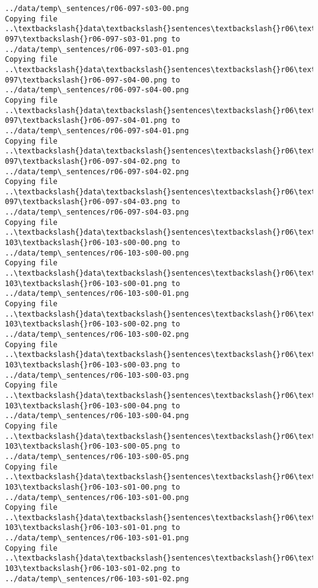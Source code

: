 \documentclass[11pt]{article}
\begin{document}
\begin{Verbatim}[commandchars=\\\{\}]
../data/temp\_sentences/r06-097-s03-00.png
Copying file ..\textbackslash{}data\textbackslash{}sentences\textbackslash{}r06\textbackslash{}r06-097\textbackslash{}r06-097-s03-01.png to
../data/temp\_sentences/r06-097-s03-01.png
Copying file ..\textbackslash{}data\textbackslash{}sentences\textbackslash{}r06\textbackslash{}r06-097\textbackslash{}r06-097-s04-00.png to
../data/temp\_sentences/r06-097-s04-00.png
Copying file ..\textbackslash{}data\textbackslash{}sentences\textbackslash{}r06\textbackslash{}r06-097\textbackslash{}r06-097-s04-01.png to
../data/temp\_sentences/r06-097-s04-01.png
Copying file ..\textbackslash{}data\textbackslash{}sentences\textbackslash{}r06\textbackslash{}r06-097\textbackslash{}r06-097-s04-02.png to
../data/temp\_sentences/r06-097-s04-02.png
Copying file ..\textbackslash{}data\textbackslash{}sentences\textbackslash{}r06\textbackslash{}r06-097\textbackslash{}r06-097-s04-03.png to
../data/temp\_sentences/r06-097-s04-03.png
Copying file ..\textbackslash{}data\textbackslash{}sentences\textbackslash{}r06\textbackslash{}r06-103\textbackslash{}r06-103-s00-00.png to
../data/temp\_sentences/r06-103-s00-00.png
Copying file ..\textbackslash{}data\textbackslash{}sentences\textbackslash{}r06\textbackslash{}r06-103\textbackslash{}r06-103-s00-01.png to
../data/temp\_sentences/r06-103-s00-01.png
Copying file ..\textbackslash{}data\textbackslash{}sentences\textbackslash{}r06\textbackslash{}r06-103\textbackslash{}r06-103-s00-02.png to
../data/temp\_sentences/r06-103-s00-02.png
Copying file ..\textbackslash{}data\textbackslash{}sentences\textbackslash{}r06\textbackslash{}r06-103\textbackslash{}r06-103-s00-03.png to
../data/temp\_sentences/r06-103-s00-03.png
Copying file ..\textbackslash{}data\textbackslash{}sentences\textbackslash{}r06\textbackslash{}r06-103\textbackslash{}r06-103-s00-04.png to
../data/temp\_sentences/r06-103-s00-04.png
Copying file ..\textbackslash{}data\textbackslash{}sentences\textbackslash{}r06\textbackslash{}r06-103\textbackslash{}r06-103-s00-05.png to
../data/temp\_sentences/r06-103-s00-05.png
Copying file ..\textbackslash{}data\textbackslash{}sentences\textbackslash{}r06\textbackslash{}r06-103\textbackslash{}r06-103-s01-00.png to
../data/temp\_sentences/r06-103-s01-00.png
Copying file ..\textbackslash{}data\textbackslash{}sentences\textbackslash{}r06\textbackslash{}r06-103\textbackslash{}r06-103-s01-01.png to
../data/temp\_sentences/r06-103-s01-01.png
Copying file ..\textbackslash{}data\textbackslash{}sentences\textbackslash{}r06\textbackslash{}r06-103\textbackslash{}r06-103-s01-02.png to
../data/temp\_sentences/r06-103-s01-02.png

\end{Verbatim}
\end{document}
